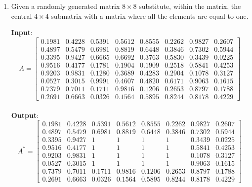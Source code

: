 \documentclass[oneside]{article}
\begin{document}
\begin{enumerate}
	\item
	      Given a randomly generated matrix $8 \times 8$ substitute, within the matrix, the central $4 \times 4$ submatrix with a matrix where all the elements are equal to one.
	      \begin{tcolorbox}[blanker, breakable, left=5mm, before skip=10pt, after skip=10pt, borderline west={1mm}{0pt}{primarycolor}]
		      \textbf{Input}: \begin{equation*}
			      A = \begin{bmatrix}
				      0.1981 & 0.4228 & 0.5391 & 0.5612 & 0.8555 & 0.2262 & 0.9827 & 0.2607 \\
				      0.4897 & 0.5479 & 0.6981 & 0.8819 & 0.6448 & 0.3846 & 0.7302 & 0.5944 \\
				      0.3395 & 0.9427 & 0.6665 & 0.6692 & 0.3763 & 0.5830 & 0.3439 & 0.0225 \\
				      0.9516 & 0.4177 & 0.1781 & 0.1904 & 0.1909 & 0.2518 & 0.5841 & 0.4253 \\
				      0.9203 & 0.9831 & 0.1280 & 0.3689 & 0.4283 & 0.2904 & 0.1078 & 0.3127 \\
				      0.0527 & 0.3015 & 0.9991 & 0.4607 & 0.4820 & 0.6171 & 0.9063 & 0.1615 \\
				      0.7379 & 0.7011 & 0.1711 & 0.9816 & 0.1206 & 0.2653 & 0.8797 & 0.1788 \\
				      0.2691 & 0.6663 & 0.0326 & 0.1564 & 0.5895 & 0.8244 & 0.8178 & 0.4229
			      \end{bmatrix}
		      \end{equation*} \\
		      \textbf{Output}: \begin{equation*}
			      A^* = \begin{bmatrix}
				      0.1981 & 0.4228 & 0.5391 & 0.5612 & 0.8555 & 0.2262 & 0.9827 & 0.2607 \\
				      0.4897 & 0.5479 & 0.6981 & 0.8819 & 0.6448 & 0.3846 & 0.7302 & 0.5944 \\
				      0.3395 & 0.9427 & 1      & 1      & 1      & 1      & 0.3439 & 0.0225 \\
				      0.9516 & 0.4177 & 1      & 1      & 1      & 1      & 0.5841 & 0.4253 \\
				      0.9203 & 0.9831 & 1      & 1      & 1      & 1      & 0.1078 & 0.3127 \\
				      0.0527 & 0.3015 & 1      & 1      & 1      & 1      & 0.9063 & 0.1615 \\
				      0.7379 & 0.7011 & 0.1711 & 0.9816 & 0.1206 & 0.2653 & 0.8797 & 0.1788 \\
				      0.2691 & 0.6663 & 0.0326 & 0.1564 & 0.5895 & 0.8244 & 0.8178 & 0.4229
			      \end{bmatrix}
		      \end{equation*}
	      \end{tcolorbox}


\end{enumerate}
\end{document}
